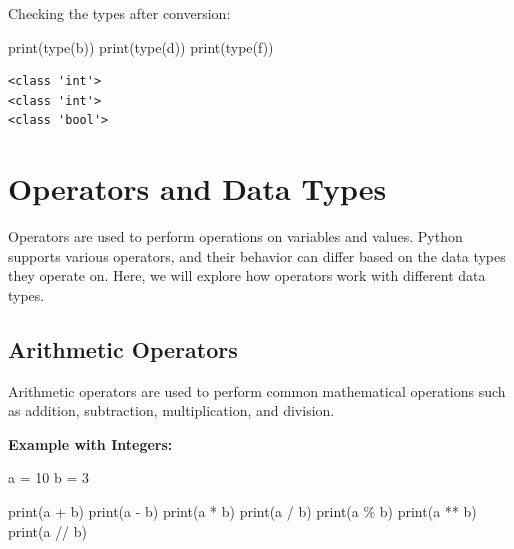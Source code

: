\documentclass[
  letterpaper,
  DIV=11,
  numbers=noendperiod]{scrreprt}
\newenvironment{Shaded}{\begin{snugshade}}{\end{snugshade}}
\newcommand{\BuiltInTok}[1]{\textcolor[rgb]{0.00,0.23,0.31}{#1}}
\newcommand{\DecValTok}[1]{\textcolor[rgb]{0.68,0.00,0.00}{#1}}
\newcommand{\NormalTok}[1]{\textcolor[rgb]{0.00,0.23,0.31}{#1}}
\newcommand{\OperatorTok}[1]{\textcolor[rgb]{0.37,0.37,0.37}{#1}}
\begin{document}
Checking the types after conversion:

\begin{Shaded}
\begin{Highlighting}[]
\BuiltInTok{print}\NormalTok{(}\BuiltInTok{type}\NormalTok{(b))}
\BuiltInTok{print}\NormalTok{(}\BuiltInTok{type}\NormalTok{(d))}
\BuiltInTok{print}\NormalTok{(}\BuiltInTok{type}\NormalTok{(f))}
\end{Highlighting}
\end{Shaded}

\begin{verbatim}
<class 'int'>
<class 'int'>
<class 'bool'>
\end{verbatim}

\hypertarget{operators-and-data-types}{%
\section{Operators and Data Types}\label{operators-and-data-types}}

Operators are used to perform operations on variables and values. Python
supports various operators, and their behavior can differ based on the
data types they operate on. Here, we will explore how operators work
with different data types.

\hypertarget{arithmetic-operators}{%
\subsection{Arithmetic Operators}\label{arithmetic-operators}}

Arithmetic operators are used to perform common mathematical operations
such as addition, subtraction, multiplication, and division.

\textbf{Example with Integers:}

\begin{Shaded}
\begin{Highlighting}[]
\NormalTok{a }\OperatorTok{=} \DecValTok{10}
\NormalTok{b }\OperatorTok{=} \DecValTok{3}

\BuiltInTok{print}\NormalTok{(a }\OperatorTok{+}\NormalTok{ b) }
\BuiltInTok{print}\NormalTok{(a }\OperatorTok{{-}}\NormalTok{ b)  }
\BuiltInTok{print}\NormalTok{(a }\OperatorTok{*}\NormalTok{ b)  }
\BuiltInTok{print}\NormalTok{(a }\OperatorTok{/}\NormalTok{ b)  }
\BuiltInTok{print}\NormalTok{(a }\OperatorTok{\%}\NormalTok{ b)  }
\BuiltInTok{print}\NormalTok{(a }\OperatorTok{**}\NormalTok{ b) }
\BuiltInTok{print}\NormalTok{(a }\OperatorTok{//}\NormalTok{ b)  }
\end{Highlighting}
\end{Shaded}
\end{document}
